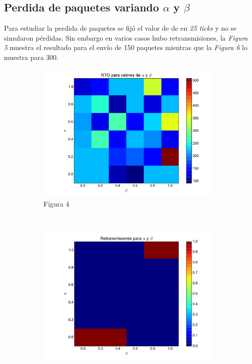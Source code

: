     \subsection{Perdida de paquetes variando $\alpha$ y $\beta$}
        Para estudiar la perdida de paquetes se fij\'o el valor de 
        de \rto{} en \textit{25 ticks} y no se simularon p\'erdidas.
        Sin embargo en varios casos hubo retransmisiones, la 
        \textit{Figura 5} muestra el resultado para el env\'io de 150
        paquetes mientras que la \textit{Figura 6} lo muestra para 300.
        
    \begin{figure}[H]
	    \center
	    \begin{subfigure}{0.32\textwidth}
		    \includegraphics[width=1.0\textwidth]{imagenes/rto_vs_alphaBeta.pdf}
		    \caption*{Figura 4}
	    \end{subfigure}
	    ~
	    \begin{subfigure}{0.32\textwidth}
		    \includegraphics[width=1.0\textwidth]{imagenes/retransmisiones_150.pdf}

\end{subfigure}
\end{figure}
